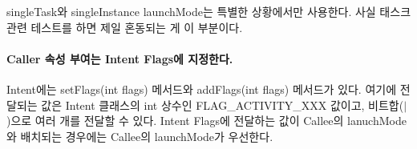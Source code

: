 singleTask와 singleInstance launchMode는 특별한 상황에서만 사용한다. 사실 태스크 관련 테스트를 하면 제일 혼동되는 게 이 부분이다.

\paragraph{Caller 속성 부여는 Intent Flags에 지정한다.}
Intent에는 setFlags(int flags) 메서드와 addFlags(int flags) 메서드가 있다. 여기에 전달되는 값은 Intent 클래스의 int 상수인 FLAG\_ACTIVITY\_XXX 값이고, 비트합($|$)으로 여러 개를 전달할 수 있다. 
Intent Flags에 전달하는 값이 Callee의 lanuchMode와 배치되는 경우에는 Callee의 launchMode가 우선한다.\\

